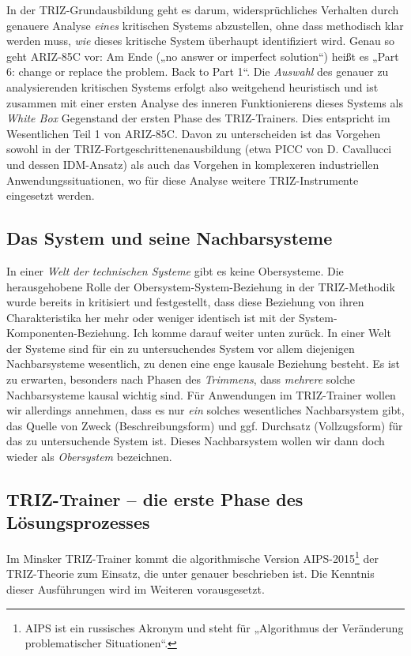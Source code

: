 \documentclass[11pt,a4paper]{article}
\begin{document}
In der TRIZ-Grundausbildung geht es darum, widersprüchliches Verhalten durch
genauere Analyse \emph{eines} kritischen Systems abzustellen, ohne dass
methodisch klar werden muss, \emph{wie} dieses kritische System überhaupt
identifiziert wird.  Genau so geht ARIZ-85C vor: Am Ende („no answer or
imperfect solution“) heißt es „Part 6: change or replace the problem. Back to
Part 1“. Die \emph{Auswahl} des genauer zu analysierenden kritischen Systems
erfolgt also weitgehend heuristisch und ist zusammen mit einer ersten Analyse
des inneren Funktionierens dieses Systems als \emph{White Box} Gegenstand der
ersten Phase des TRIZ-Trainers.  Dies entspricht im Wesentlichen Teil 1 von
ARIZ-85C.  Davon zu unterscheiden ist das Vorgehen sowohl in der
TRIZ-Fortgeschrittenenausbildung (etwa PICC \cite{Cavallucci} von
D. Cavallucci und dessen IDM-Ansatz) als auch das Vorgehen in komplexeren
industriellen Anwendungssituationen, wo für diese Analyse weitere
TRIZ-Instrumente eingesetzt werden.

\subsection*{Das System und seine Nachbarsysteme}

In einer \emph{Welt der technischen Systeme} gibt es keine Obersysteme. Die
herausgehobene Rolle der Obersystem-System-Beziehung in der TRIZ-Methodik
wurde bereits in \cite[S. 16]{Graebe2020} kritisiert und festgestellt, dass
diese Beziehung von ihren Charakteristika her mehr oder weniger identisch ist
mit der System-Komponenten-Beziehung. Ich komme darauf weiter unten zurück.
In einer Welt der Systeme sind für ein zu untersuchendes System vor allem
diejenigen Nachbarsysteme wesentlich, zu denen eine enge kausale Beziehung
besteht.  Es ist zu erwarten, besonders nach Phasen des \emph{Trimmens}, dass
\emph{mehrere} solche Nachbarsysteme kausal wichtig sind.  Für Anwendungen im
TRIZ-Trainer wollen wir allerdings annehmen, dass es nur \emph{ein} solches
wesentliches Nachbarsystem gibt, das Quelle von Zweck (Beschreibungsform) und
ggf. Durchsatz (Vollzugsform) für das zu untersuchende System ist. Dieses
Nachbarsystem wollen wir dann doch wieder als \emph{Obersystem} bezeichnen.

\subsection*{TRIZ-Trainer -- die erste Phase des Lösungsprozesses}

Im Minsker TRIZ-Trainer kommt die algorithmische Version
AIPS-2015\footnote{AIPS ist ein russisches Akronym und steht für „Algorithmus
  der Veränderung problematischer Situationen“.} der TRIZ-Theorie zum Einsatz,
die unter \cite{TRIZTrainer.Problemloesungsprozess} genauer beschrieben ist.
Die Kenntnis dieser Ausführungen wird im Weiteren vorausgesetzt.
\end{document}
